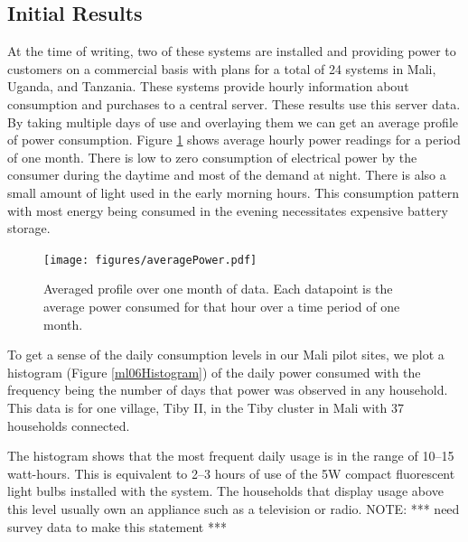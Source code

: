 \documentclass[conference]{IEEEtran}
\newcommand{\note}[1]{{\color{red} NOTE: *** #1 ***}}
\begin{document}


\subsection{Initial Results}
At the time of writing, two of these systems are installed and providing
power to customers on a commercial basis with plans for a total of
24 systems in Mali, Uganda, and Tanzania.
These systems provide hourly information about consumption and purchases
to a central server.
These results use this server data.
By taking multiple days of use and overlaying them we can get an average
profile of power consumption.
Figure \ref{averagedAccumulatedEnergy} shows average hourly power readings
for a period of one month.
There is low to zero consumption of electrical power by the consumer during the
daytime and most of the demand at night.
There is also a small amount of light used in the early morning hours.
This consumption pattern with most energy being consumed in the evening
necessitates expensive battery storage.

\begin{figure}[]
\begin{center}
\texttt{[image: figures/averagePower.pdf]}
\end{center}
\caption{Averaged profile over one month of data.  Each datapoint is the
average power consumed for that hour over a time period of one month.}
\label{averagedAccumulatedEnergy}
\end{figure}

To get a sense of the daily consumption levels in our Mali pilot sites,
we plot a histogram (Figure \ref{ml06Histogram}) of the daily
power consumed with the frequency being
the number of days that power was observed in any household.
This data is for one village, Tiby II, in the Tiby cluster in Mali with
37 households connected.

The histogram shows that the most frequent
daily usage is in the range of 10--15 watt-hours.
This is equivalent to 2--3 hours of use of the 5W compact fluorescent
light bulbs installed with the system.
The households that display usage above this level usually own an appliance
such as a television or radio.
\note{need survey data to make this statement}
\end{document}
